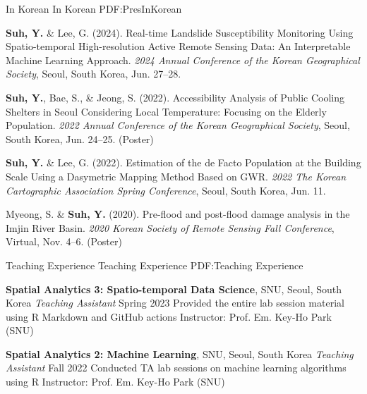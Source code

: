 \documentclass[letterpaper,MMMyyyy,nonstopmode]{simpleresumecv}
\begin{document}
\begin{Body}
\BigGap

\SubSection
{In Korean}
{In Korean}
{PDF:PresInKorean}

\BigGap

\NumberedItem{[4]}
\textbf{Suh, Y.} \& Lee, G. (2024).
Real-time Landslide Susceptibility Monitoring Using Spatio-temporal High-resolution Active Remote Sensing Data: An Interpretable Machine Learning Approach.
\textit{2024 Annual Conference of the Korean Geographical Society}, Seoul, South Korea, Jun. 27–28.

\BigGap

\NumberedItem{[3]}
\textbf{Suh, Y.}, Bae, S., \& Jeong, S. (2022).
Accessibility Analysis of Public Cooling Shelters in Seoul Considering Local Temperature: Focusing on the Elderly Population.
\textit{2022 Annual Conference of the Korean Geographical Society}, Seoul, South Korea, Jun. 24–25. \hfill (Poster)

\BigGap

\NumberedItem{[2]}
\textbf{Suh, Y.} \& Lee, G. (2022).
Estimation of the de Facto Population at the Building Scale Using a Dasymetric Mapping Method Based on GWR.
\textit{2022 The Korean Cartographic Association Spring Conference}, Seoul, South Korea, Jun. 11.

\BigGap

\NumberedItem{[1]}
Myeong, S. \& \textbf{Suh, Y.} (2020).
Pre-flood and post-flood damage analysis in the Imjin River Basin.
\textit{2020 Korean Society of Remote Sensing Fall Conference}, Virtual, Nov. 4–6. \hfill (Poster)





\Section
{Teaching Experience}
{Teaching Experience}
{PDF:Teaching Experience}

\Entry
\textbf{Spatial Analytics 3: Spatio-temporal Data Science}, SNU, Seoul, South Korea
\Gap
\textit{      Teaching Assistant}
\hfill
Spring 2023
\Gap
\SubBulletItem
Provided the entire lab session material using R Markdown and GitHub actions
\Gap
\SubBulletItem
Instructor: Prof. Em. Key-Ho Park (SNU)

\BigGap
\Entry

\textbf{Spatial Analytics 2: Machine Learning}, SNU, Seoul, South Korea
\Gap
\textit{      Teaching Assistant}
\hfill
Fall 2022
\Gap
\SubBulletItem
Conducted TA lab sessions on machine learning algorithms using R
\Gap
\SubBulletItem
Instructor: Prof. Em. Key-Ho Park (SNU)


\end{Body}
\end{document}
